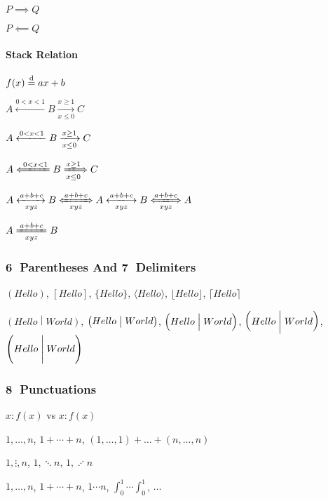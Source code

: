 $ P \implies Q $

$ P \impliedby Q $

\paragraph{Stack Relation}
{\LARGE
    $ f(x) \stackrel{\text{d}}{=} ax+b $
}

\vspace{2em}

{\LARGE
    $ A \xleftarrow{0<x<1} B \xrightarrow[x\leq 0]{x\geq 1} C $   %
}

\vspace{2em}

{\LARGE
    $ A \xlongleftarrow{0<x<1} B \xlongrightarrow[x\leq 0]{x\geq 1} C $

    $ A \xLongleftarrow{0<x<1} B \xLongrightarrow[x\leq 0]{x\geq 1} C $

    $ A \xleftrightarrow[xyz]{a+b+c} B \xLeftrightarrow[xyz]{a+b+c} A 
    \xlongleftrightarrow[xyz]{a+b+c} B \xLongleftrightarrow[xyz]{a+b+c} A $

    $ A \xlongequal[xyz]{a+b+c} B $
}

\subsubsection{\textcircled{6} Parentheses And \textcircled{7} Delimiters}
$ (Hello) $, $ [Hello] $, $ \{ Hello \} $,      %
$ \langle Hello \rangle $, $ \lfloor Hello \rfloor $, $ \lceil Hello \rceil $

$ \left( Hello \middle\vert World \right) $, $ \bigl( Hello \bigm\vert World \bigr) $, 
$ \Bigl( Hello \Bigm\vert World \Bigr) $, $ \biggl( Hello \biggm\vert World \biggr) $, 
$ \Biggl( Hello \Biggm\vert World \Biggr) $

\subsubsection{\textcircled{8} Punctuations}
$ x \colon f(x) $ vs $ x : f(x) $

$ 1, \ldots, n $, $ 1 + \cdots + n $, 
$ (1, \dots, 1) + \dots + (n, \dots, n) $   %

$ 1, \vdots, n $, $ 1, \ddots n $, $ 1, \iddots n $     %

$ 1, \dotsc, n $, $ 1 + \dotsb + n $, $ 1 \dotsm n $, $ \int_0^1 \dotsi \int_0^1 $, $ \dotso $  %

